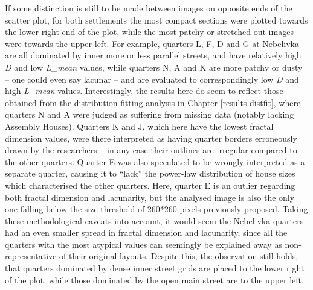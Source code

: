 \documentclass[
  12pt,
  a4paper, twoside]{book}
\begin{document}
If some distinction is still to be made between images on opposite ends of the scatter plot, for both settlements the most compact sections were plotted towards the lower right end of the plot, while the most patchy or stretched-out images were towards the upper left. For example, quarters L, F, D and G at Nebelivka are all dominated by inner more or less parallel streets, and have relatively high \emph{D} and low \emph{L\_mean} values, while quarters N, A and K are more patchy or dusty -- one could even say lacunar -- and are evaluated to correspondingly low \emph{D} and high \emph{L\_mean} values. Interestingly, the results here do seem to reflect those obtained from the distribution fitting analysis in Chapter \ref{results-distfit}, where quarters N and A were judged as suffering from missing data (notably lacking Assembly Houses). Quarters K and J, which here have the lowest fractal dimension values, were there interpreted as having quarter borders erroneously drawn by the researchers -- in any case their outlines are irregular compared to the other quarters. Quarter E was also speculated to be wrongly interpreted as a separate quarter, causing it to ``lack'' the power-law distribution of house sizes which characterised the other quarters. Here, quarter E is an outlier regarding both fractal dimension and lacunarity, but the analysed image is also the only one falling below the size threshold of 260*260 pixels previously proposed. Taking these methodological caveats into account, it would seem the Nebelivka quarters had an even smaller spread in fractal dimension and lacunarity, since all the quarters with the most atypical values can seemingly be explained away as non-representative of their original layouts. Despite this, the observation still holds, that quarters dominated by dense inner street grids are placed to the lower right of the plot, while those dominated by the open main street are to the upper left.
\end{document}
